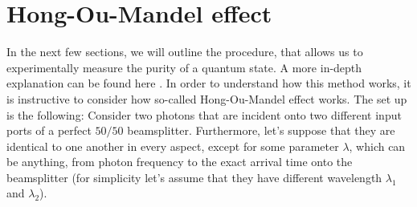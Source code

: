 \section{Hong-Ou-Mandel effect}
In the next few sections, we will outline the procedure, that allows us to experimentally measure the purity of a quantum state. A more in-depth explanation can be found here \cite{preiss thesis}. In order to understand how this method works, it is instructive to consider how so-called Hong-Ou-Mandel effect \cite{HOM} works. The set up is the following: Consider two photons that are incident onto two different input ports of a perfect $50/50$ beamsplitter. Furthermore, let's suppose that they are identical to one another in every aspect, except for some parameter $\lambda$, which can be anything, from photon frequency to the exact arrival time onto the beamsplitter (for simplicity let's assume that they have different wavelength $\lambda_1$ and $\lambda_2$).

